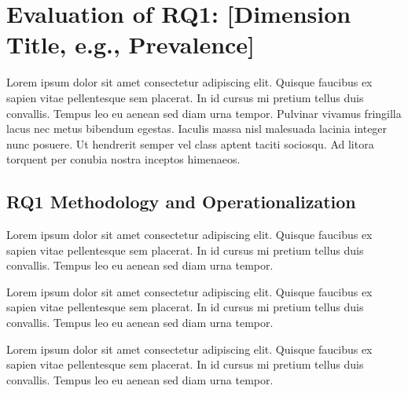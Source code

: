\documentclass[sigconf,nonacm]{acmart} %
\begin{document}
\section{Evaluation of RQ1: [Dimension Title, e.g., Prevalence]}
\label{sec:rq1_evaluation}

Lorem ipsum dolor sit amet consectetur adipiscing elit. 
Quisque faucibus ex sapien vitae pellentesque sem placerat. 
In id cursus mi pretium tellus duis convallis.
Tempus leo eu aenean sed diam urna tempor. 
Pulvinar vivamus fringilla lacus nec metus bibendum egestas.
Iaculis massa nisl malesuada lacinia integer nunc posuere. 
Ut hendrerit semper vel class aptent taciti sociosqu. 
Ad litora torquent per conubia nostra inceptos himenaeos.

\subsection{RQ1 Methodology and Operationalization}
\label{subsec:rq1_methodology}


Lorem ipsum dolor sit amet consectetur adipiscing elit. 
Quisque faucibus ex sapien vitae pellentesque sem placerat. 
In id cursus mi pretium tellus duis convallis. 
Tempus leo eu aenean sed diam urna tempor.

Lorem ipsum dolor sit amet consectetur adipiscing elit. 
Quisque faucibus ex sapien vitae pellentesque sem placerat. 
In id cursus mi pretium tellus duis convallis. 
Tempus leo eu aenean sed diam urna tempor.

Lorem ipsum dolor sit amet consectetur adipiscing elit. 
Quisque faucibus ex sapien vitae pellentesque sem placerat. 
In id cursus mi pretium tellus duis convallis. 
Tempus leo eu aenean sed diam urna tempor.
\end{document}
